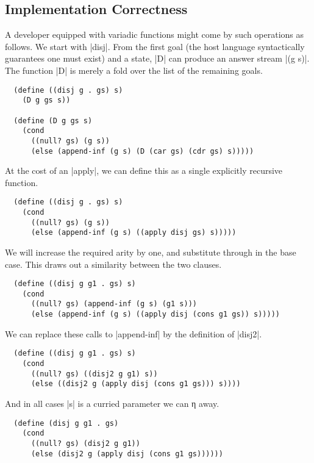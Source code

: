 \documentclass[sigplan,screen,draft,anonymous,review,natbib=false]{acmart}
\begin{document}
\subsection{Implementation Correctness}

A developer equipped with variadic functions might come by such
operations as follows. We start with \rackinline|disj|. From the first
goal (the host language syntactically guarantees one must exist) and a
state, \rackinline|D| can produce an answer stream \rackinline|(g s)|.
The function \rackinline|D| is merely a fold over the list of the
remaining goals.

\begin{verbatim}
  (define ((disj g . gs) s)
    (D g gs s))

  (define (D g gs s)
    (cond
      ((null? gs) (g s))
      (else (append-inf (g s) (D (car gs) (cdr gs) s)))))
\end{verbatim}

At the cost of an \rackinline|apply|, we can define this as a single
explicitly recursive function.

\begin{verbatim}
  (define ((disj g . gs) s)
    (cond
      ((null? gs) (g s))
      (else (append-inf (g s) ((apply disj gs) s)))))
\end{verbatim}

We will increase the required arity by one, and substitute through in
the base case. This draws out a similarity between the two clauses.

\begin{verbatim}
  (define ((disj g g1 . gs) s)
    (cond
      ((null? gs) (append-inf (g s) (g1 s)))
      (else (append-inf (g s) ((apply disj (cons g1 gs)) s)))))
\end{verbatim}

We can replace these calls to \rackinline|append-inf| by the definition
of \rackinline|disj2|.

\begin{verbatim}
  (define ((disj g g1 . gs) s)
    (cond
      ((null? gs) ((disj2 g g1) s))
      (else ((disj2 g (apply disj (cons g1 gs))) s))))
\end{verbatim}

And in all cases \rackinline|s| is a curried parameter we can η
away.

\begin{verbatim}
  (define (disj g g1 . gs)
    (cond
      ((null? gs) (disj2 g g1))
      (else (disj2 g (apply disj (cons g1 gs))))))
\end{verbatim}
\end{document}
